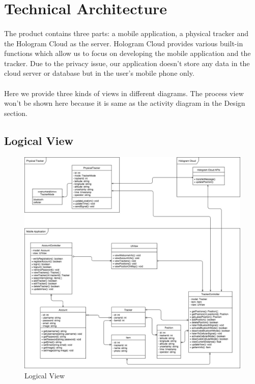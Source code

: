 \documentclass[12pt,a4paper]{article}
\begin{document}
    \section{Technical Architecture}          
      \paragraph{}
        The product contains three parts: a mobile application, a physical tracker and the Hologram Cloud as the server. Hologram Cloud provides various built-in functions which allow us to focus on developing the mobile application and the tracker. Due to the privacy issue, our application doesn't store any data in the cloud server or database but in the user's mobile phone only.
      \paragraph{}
        Here we provide three kinds of views in different diagrams. The process view won't be shown here because it is same as the activity diagram in the Design section.

      \subsection{Logical View}
        \begin{figure}[H]
          \centering
          \includegraphics[width=1\textwidth]{assets/7-technical-architecture-logical.jpg}
          \caption{Logical View}
          \label{fig:Logical View}
        \end{figure}
\end{document}

